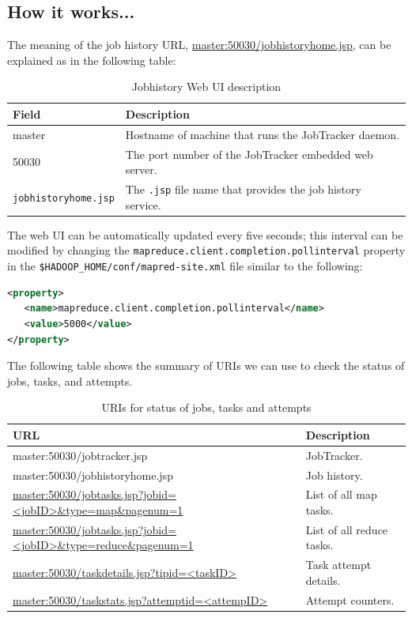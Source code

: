 \subsection*{How it works...}
The meaning of the job history URL, \url{master:50030/jobhistoryhome.jsp}, can be explained as in the following table:
\begin{table}
  \centering
  \begin{tabular}{ll}
    \toprule 
    \textbf{Field} & \textbf{Description} \\  \midrule
    master & Hostname of machine that runs the JobTracker daemon. \\
    50030 & The port number of the JobTracker embedded web server. \\
    \verb|jobhistoryhome.jsp| & The \verb|.jsp| file name that provides the job history service. \\ \bottomrule
  \end{tabular}
  \caption{Jobhistory Web UI description}\label{tbl:jobhistory}
\end{table}

The web UI can be automatically updated every five seconds; this interval can be modified by changing the \verb|mapreduce.client.completion.pollinterval| property in the \verb|$HADOOP_HOME/conf/mapred-site.xml| file similar to the following:
\lstset{style=bashstyle}
\begin{lstlisting}[language=XML]
<property>
   <name>mapreduce.client.completion.pollinterval</name>
   <value>5000</value>
</property>
\end{lstlisting}

The following table shows the summary of URIs we can use to check the status of jobs, tasks, and attempts.
\begin{table}
  \scriptsize
  \centering
  \begin{tabular}{ll}
    \toprule 
    \textbf{URL} & \textbf{Description} \\ \midrule
    master:50030/jobtracker.jsp & JobTracker.\\
    master:50030/jobhistoryhome.jsp & Job history. \\
    \url{master:50030/jobtasks.jsp?jobid=<jobID>&type=map&pagenum=1} & List of all map tasks. \\
    \url{master:50030/jobtasks.jsp?jobid=<jobID>&type=reduce&pagenum=1} & List of all reduce tasks. \\
    \url{master:50030/taskdetails.jsp?tipid=<taskID>} & Task attempt details. \\
    \url{master:50030/taskstats.jsp?attemptid=<attempID>} & Attempt counters. \\ \bottomrule
  \end{tabular}
  \caption{URIs for status of jobs, tasks and attempts}\label{tbl:statusuris}
\end{table}

